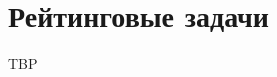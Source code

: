 \documentclass[12pt,a4paper]{article}
\begin{document}
    \section*{Рейтинговые задачи}

    \begin{enumproblem}TBP





            

\end{enumproblem}
\end{document}
